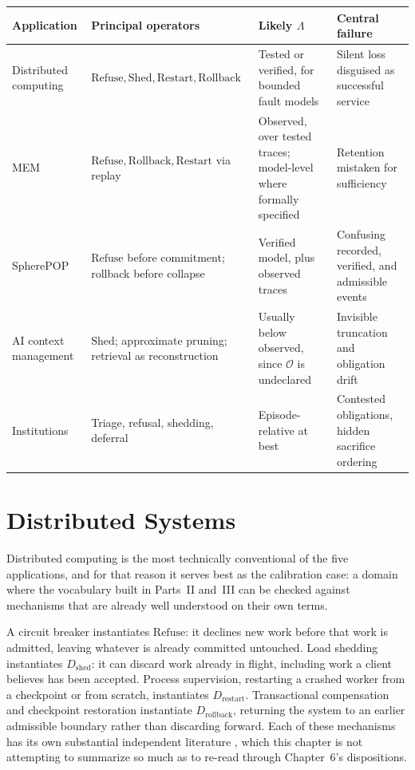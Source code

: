 \documentclass[11pt]{report}
\newcommand{\Refuse}{\mathrm{Refuse}}
\newcommand{\Shed}{\mathrm{Shed}}
\newcommand{\Restart}{\mathrm{Restart}}
\newcommand{\Rollback}{\mathrm{Rollback}}
\begin{document}
\begin{table}[h]
\centering
\renewcommand{\arraystretch}{1.3}
\begin{tabular}{p{2.6cm}p{3.3cm}p{3.6cm}p{4.2cm}}
\toprule
Application & Principal operators & Likely $\Lambda$ & Central failure \\
\midrule
Distributed computing & $\Refuse, \Shed, \Restart, \Rollback$ & Tested or verified, for bounded fault models & Silent loss disguised as successful service \\
MEM\textbar 8 & $\Refuse, \Rollback, \Restart$ via replay & Observed, over tested traces; model-level where formally specified & Retention mistaken for sufficiency \\
SpherePOP & $\Refuse$ before commitment; rollback before collapse & Verified model, plus observed traces & Confusing recorded, verified, and admissible events \\
AI context management & $\Shed$; approximate pruning; retrieval as reconstruction & Usually below observed, since $\mathcal O$ is undeclared & Invisible truncation and obligation drift \\
Institutions & Triage, refusal, shedding, deferral & Episode-relative at best & Contested obligations, hidden sacrifice ordering \\
\bottomrule
\end{tabular}
\end{table}

\chapter{Distributed Systems}

Distributed computing is the most technically conventional of the five applications, and for that reason it serves best as the calibration case: a domain where the vocabulary built in Parts~II and~III can be checked against mechanisms that are already well understood on their own terms.

A circuit breaker instantiates $\Refuse$: it declines new work before that work is admitted, leaving whatever is already committed untouched. Load shedding instantiates $D_{\mathrm{shed}}$: it can discard work already in flight, including work a client believes has been accepted. Process supervision, restarting a crashed worker from a checkpoint or from scratch, instantiates $D_{\mathrm{restart}}$. Transactional compensation and checkpoint restoration instantiate $D_{\mathrm{rollback}}$, returning the system to an earlier admissible boundary rather than discarding forward. Each of these mechanisms has its own substantial independent literature \cite{lamport1978,gray1978,dean2013,kleppmann2017}, which this chapter is not attempting to summarize so much as to re-read through Chapter~6's dispositions.
\end{document}
